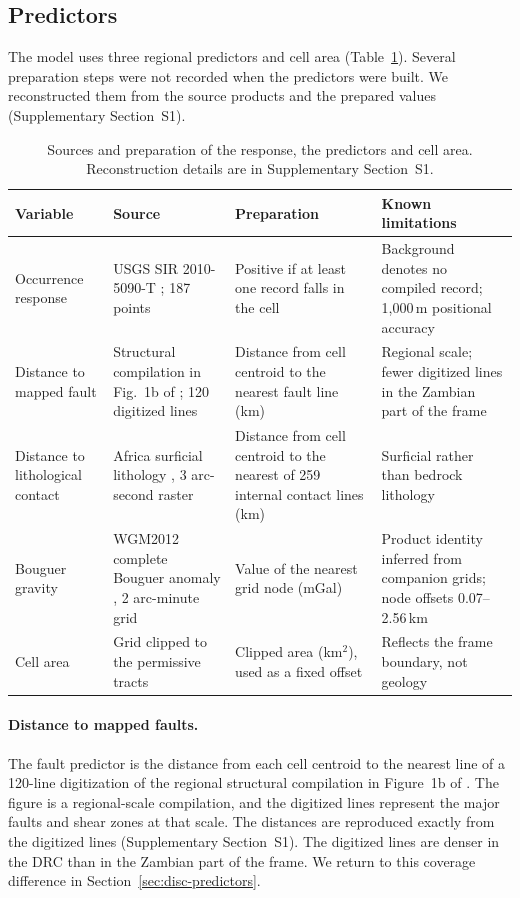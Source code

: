 \documentclass[pdflatex,sn-basic]{sn-jnl}%
\begin{document}
\subsection{Predictors}
\label{sec:data}

The model uses three regional predictors and cell area (Table~\ref{tab:data}). Several preparation steps were not recorded when the predictors were built. We reconstructed them from the source products and the prepared values (Supplementary Section~S1).

\begin{table}[tbp]
\centering
\scriptsize
\caption{Sources and preparation of the response, the predictors and cell area. Reconstruction details are in Supplementary Section~S1.}
\label{tab:data}
\begin{tabular}{@{}>{\raggedright\arraybackslash}p{}>{\raggedright\arraybackslash}p{}>{\raggedright\arraybackslash}p{}>{\raggedright\arraybackslash}p{}@{}}
\toprule
Variable & Source & Preparation & Known limitations \\
\midrule
Occurrence response & USGS SIR 2010-5090-T \citep{USGS2014CACB}; 187 points & Positive if at least one record falls in the cell & Background denotes no compiled record; 1,000\,m positional accuracy \\
\addlinespace
Distance to mapped fault & Structural compilation in Fig.~1b of \citet{Selley2005}; 120 digitized lines & Distance from cell centroid to the nearest fault line (km) & Regional scale; fewer digitized lines in the Zambian part of the frame \\
\addlinespace
Distance to lithological contact & Africa surficial lithology \citep{SayreKabuchanga2015}, 3 arc-second raster & Distance from cell centroid to the nearest of 259 internal contact lines (km) & Surficial rather than bedrock lithology \\
\addlinespace
Bouguer gravity & WGM2012 complete Bouguer anomaly \citep{BGIWGM2012}, 2 arc-minute grid & Value of the nearest grid node (mGal) & Product identity inferred from companion grids; node offsets 0.07--2.56\,km \\
\addlinespace
Cell area & Grid clipped to the permissive tracts & Clipped area (km$^2$), used as a fixed offset & Reflects the frame boundary, not geology \\
\bottomrule
\end{tabular}
\end{table}

\paragraph{Distance to mapped faults.}
The fault predictor is the distance from each cell centroid to the nearest line of a 120-line digitization of the regional structural compilation in Figure~1b of \citet{Selley2005}. The figure is a regional-scale compilation, and the digitized lines represent the major faults and shear zones at that scale. The distances are reproduced exactly from the digitized lines (Supplementary Section~S1). The digitized lines are denser in the DRC than in the Zambian part of the frame. We return to this coverage difference in Section~\ref{sec:disc-predictors}.
\end{document}
